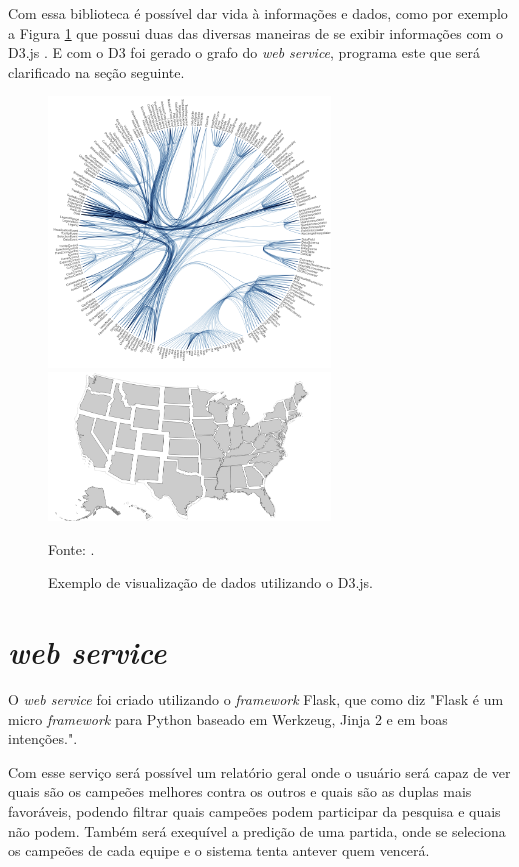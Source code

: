 Com essa biblioteca é possível dar vida à informações e dados, como por exemplo a Figura \ref{fig:d3} que possui duas das diversas maneiras de se exibir informações com o D3.js . E com o D3 foi gerado o grafo do \textit{web service}, programa este que será clarificado na seção seguinte.

\begin{figure}[H]
	\caption{Exemplo de visualização de dados utilizando o D3.js.}
	\begin{center}
		\includegraphics[width=7.5cm]{imagens/d3_1.png}%
		\hspace{1cm}%
		\includegraphics[width=7.5cm]{imagens/d3_2.PNG}%
	\end{center}
	\small{Fonte: \cite{d3js}.}
	\label{fig:d3}
\end{figure}


\section{\textit{web service}}
\label{chap:web}

O \textit{web service} foi criado utilizando o \textit{framework} Flask, que como \citet[tradução do autor]{flask} diz "Flask é um micro \textit{framework} para Python baseado em Werkzeug, Jinja 2 e em boas intenções.".

Com esse serviço será possível um relatório geral onde o usuário será capaz de ver quais são os campeões melhores contra os outros e quais são as duplas mais favoráveis, podendo filtrar quais campeões podem participar da pesquisa e quais não podem. 
Também será exequível a predição de uma partida, onde se seleciona os campeões de cada equipe e o sistema tenta antever quem vencerá.

